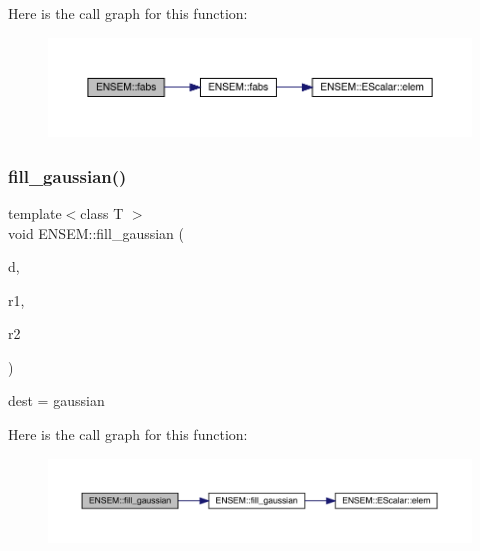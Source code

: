 Here is the call graph for this function\+:\nopagebreak
\begin{figure}[H]
\begin{center}
\leavevmode
\includegraphics[width=350pt]{da/d59/group__obsvector_ga0c007ded942b0d671e46d502b7de7294_cgraph}
\end{center}
\end{figure}
\mbox{\label{group__obsvector_ga0830d11c7cf74530fe40c56bc99ceb29}} 
\subsubsection{\texorpdfstring{fill\_gaussian()}{fill\_gaussian()}}
{\footnotesize\ttfamily template$<$class T $>$ \\
void E\+N\+S\+E\+M\+::fill\+\_\+gaussian (\begin{DoxyParamCaption}\item[{\mbox{\hyperlink{classENSEM_1_1OVector}{O\+Vector}}$<$ T $>$ \&}]{d,  }\item[{\mbox{\hyperlink{classENSEM_1_1OVector}{O\+Vector}}$<$ T $>$ \&}]{r1,  }\item[{\mbox{\hyperlink{classENSEM_1_1OVector}{O\+Vector}}$<$ T $>$ \&}]{r2 }\end{DoxyParamCaption})\hspace{0.3cm}{\ttfamily [inline]}}



dest = gaussian 

Here is the call graph for this function\+:\nopagebreak
\begin{figure}[H]
\begin{center}
\leavevmode
\includegraphics[width=350pt]{da/d59/group__obsvector_ga0830d11c7cf74530fe40c56bc99ceb29_cgraph}
\end{center}
\end{figure}
\mbox{\label{group__obsvector_ga1ba77da0ffafb0320b14d1dd9fa47179}} 

